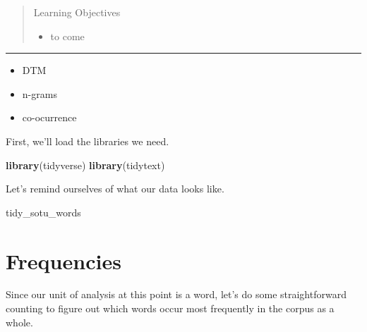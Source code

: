 \documentclass[]{book}
\newenvironment{Shaded}{\begin{snugshade}}{\end{snugshade}}
\newcommand{\DataTypeTok}[1]{\textcolor[rgb]{0.13,0.29,0.53}{#1}}
\newcommand{\KeywordTok}[1]{\textcolor[rgb]{0.13,0.29,0.53}{\textbf{#1}}}
\newcommand{\NormalTok}[1]{#1}
\newcommand{\OperatorTok}[1]{\textcolor[rgb]{0.81,0.36,0.00}{\textbf{#1}}}
\newcommand{\OtherTok}[1]{\textcolor[rgb]{0.56,0.35,0.01}{#1}}
\newcommand{\StringTok}[1]{\textcolor[rgb]{0.31,0.60,0.02}{#1}}
\providecommand{\tightlist}{%
  \setlength{\itemsep}{0pt}\setlength{\parskip}{0pt}}
\begin{document}
\begin{quote}
Learning Objectives

\begin{itemize}
\tightlist
\item
  to come
\end{itemize}
\end{quote}

\begin{center}\rule{0.5\linewidth}{\linethickness}\end{center}

\begin{itemize}
\tightlist
\item
  DTM
\item
  n-grams
\item
  co-ocurrence
\end{itemize}

First, we'll load the libraries we need.

\begin{Shaded}
\begin{Highlighting}[]
\KeywordTok{library}\NormalTok{(tidyverse)}
\KeywordTok{library}\NormalTok{(tidytext)}
\end{Highlighting}
\end{Shaded}

Let's remind ourselves of what our data looks like.

\begin{Shaded}
\begin{Highlighting}[]
\NormalTok{tidy_sotu_words}
\end{Highlighting}
\end{Shaded}

\hypertarget{frequencies}{%
\section{Frequencies}\label{frequencies}}

Since our unit of analysis at this point is a word, let's do some straightforward counting to figure out which words occur most frequently in the corpus as a whole.

\begin{Shaded}
\end{Shaded}
\end{document}
